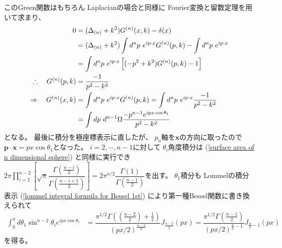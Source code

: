 このGreen関数はもちろん
Laplacianの場合と同様に
Fourier変換と留数定理を用いて求まり、
\begin{align}
    0
&=
    (\Delta_{(n)} + k^2)
    G^{(n)}( \bm{x}, k )
    -
    \delta( \bm{x} )
\notag\\&
=
    (\Delta_{(n)} + k^2)
    \int d^n p\ 
        e^{i \bm{p} \cdot \bm{x}}
        G^{(n)}( \bm{p}, k )
    -
    \int d^n p\ 
        e^{i \bm{p} \cdot \bm{x}}
\notag\\&
=
    \int d^n p\ 
        e^{i \bm{p} \cdot \bm{x}}
    \left[
        (- \bm{p}^2 + k^2)
        G^{(n)}( \bm{p}, k )
    - 1
    \right]
\notag\\\therefore\quad
    G^{(n)}( \bm{p}, k )
&=
    \dfrac{- 1}{\bm{p}^2 - k^2}
\notag\\\Rightarrow\quad
    G^{(n)}( \bm{x}, k )
&=
    \int d^n p\ 
        e^{i \bm{p} \cdot \bm{x}}
        G^{(n)}( \bm{p}, k )
=
    \int d^n p\ 
        e^{i \bm{p} \cdot \bm{x}}
        \dfrac{- 1}{\bm{p}^2 - k^2}
\notag\\&
=
    \int d p\ 
    d^{n-1} \Omega
        \dfrac{
            - p^{n-1}
            e^{i p x \cos \theta_1}
        }{p^2 - k^2}
\end{align}
となる。
最後に積分を極座標表示に直したが、
$p_n$軸を$\bm{x}$の方向に取ったので
$\bm{p} \cdot \bm{x} = px \cos \theta_1$となった。
$i = 2, \cdots, n-1$に対して
$\theta_i$角度積分は
(\ref{surface area of n dimensional sphere})
と同様に実行でき$\displaystyle
2 \pi
\prod_{i=2}^{n-2}
\left[
    \sqrt{\pi}
    \dfrac{\Gamma(\frac{n - i}{2})}
    {\Gamma(\frac{n - i + 1}{2})}
\right]
=
2 \pi^{n/2}
    \dfrac{ \Gamma(1) }{ \Gamma(\frac{n-1}{2}) }
$を出す。
$\theta_1$積分も
Lommelの積分表示
(\ref{lommel integral formula for Bessel 1st})
により第一種Bessel関数に書き換えられて
\begin{align}
    \int_0^\pi d \theta_1
        \sin^{n-2} \theta_i
        e^{i p x \cos \theta_1}
&=
    \dfrac{
        \pi^{1/2}
        \Gamma(
            (\frac{n-2}{2})
            + \frac{1}{2}
        )
    } { (px/2)^{ \frac{n-2}{2} } }
    J_{ \frac{n-2}{2} } (px)
=
    \dfrac{
        \pi^{1/2}
        \Gamma(
            \frac{n-1}{2}
        )
    } { (px/2)^{ \frac{n}{2} - 1 } }
    J_{ \frac{n}{2} - 1 } (px)
\end{align}
を得る。

